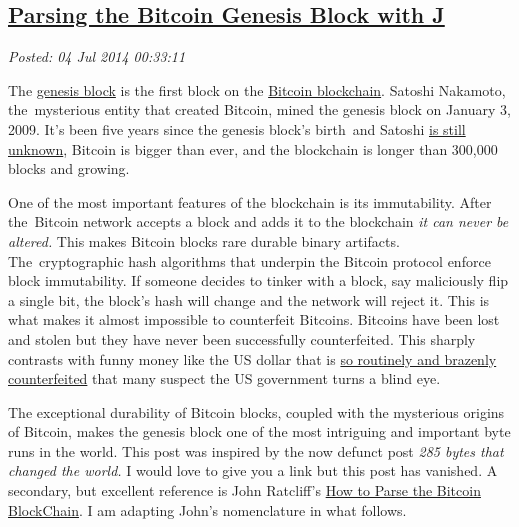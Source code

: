 %

\subsection*{\href{https://bakerjd99.wordpress.com/2014/07/03/parsing-the-bitcoin-genesis-block-with-j/}{Parsing the Bitcoin Genesis Block with J}}


\noindent\emph{Posted: 04 Jul 2014 00:33:11}
\vspace{6pt}

The \href{https://en.bitcoin.it/wiki/Genesis_block}{genesis block} is
the first block on the \href{https://blockexplorer.com/}{Bitcoin
blockchain}. Satoshi Nakamoto, the~mysterious entity that created
Bitcoin, mined the genesis block on January 3, 2009. It's been five
years since the genesis block's birth~and Satoshi
\href{http://en.wikipedia.org/wiki/Satoshi_Nakamoto}{is still unknown},
Bitcoin is bigger than ever, and the blockchain is longer than 300,000
blocks and growing.

One of the most important features of the blockchain is its
immutability. After the~Bitcoin network accepts a block and adds it to
the blockchain \emph{it can never be altered.} This makes Bitcoin blocks
rare durable binary artifacts. The~cryptographic hash algorithms that
underpin the Bitcoin protocol enforce block immutability. If someone
decides to tinker with a block, say maliciously flip a single bit, the
block's hash will change and the network will reject it. This is what
makes it almost impossible to counterfeit Bitcoins. Bitcoins have been
lost and stolen but they have never been successfully counterfeited.
This sharply contrasts with funny money like the US dollar that is
\href{http://www.npr.org/blogs/money/2013/09/05/219264902/the-world-capital-of-counterfeit-dollars}{so
routinely and brazenly counterfeited} that many suspect the US
government turns a blind eye.

The exceptional durability of Bitcoin blocks, coupled with the
mysterious origins of Bitcoin, makes the genesis block one of the most
intriguing and important byte runs in the world. This post was inspired
by the now defunct post \emph{285 bytes that changed the world.} I would
love to give you a link but this post has vanished. A secondary, but
excellent reference is John Ratcliff's
\href{http://codesuppository.blogspot.com/2014/01/how-to-parse-bitcoin-blockchain.html}{How
to Parse the Bitcoin BlockChain}. I am adapting John's nomenclature in
what follows.

